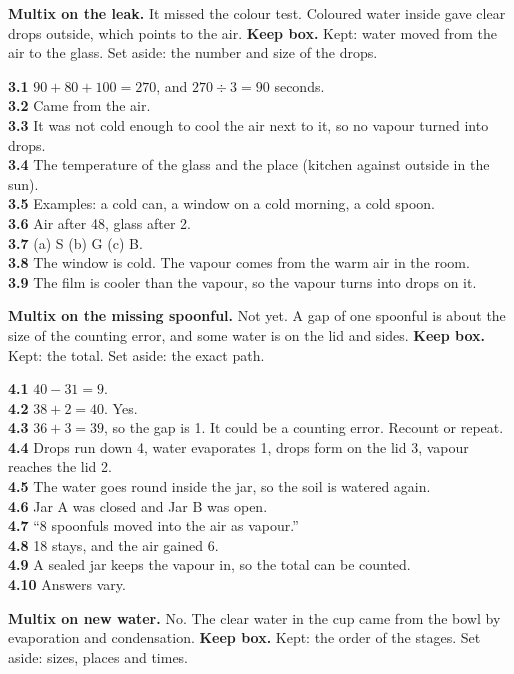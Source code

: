 \textbf{Multix on the leak.} It missed the colour test. Coloured water inside gave clear drops outside, which points to the air. \textbf{Keep box.} Kept: water moved from the air to the glass. Set aside: the number and size of the drops.

\textbf{3.1} $90+80+100=270$, and $270\div3=90$ seconds.\\
\textbf{3.2} Came from the air.\\
\textbf{3.3} It was not cold enough to cool the air next to it, so no vapour turned into drops.\\
\textbf{3.4} The temperature of the glass and the place (kitchen against outside in the sun).\\
\textbf{3.5} Examples: a cold can, a window on a cold morning, a cold spoon.\\
\textbf{3.6} Air after 48, glass after 2.\\
\textbf{3.7} (a) S (b) G (c) B.\\
\textbf{3.8} The window is cold. The vapour comes from the warm air in the room.\\
\textbf{3.9} The film is cooler than the vapour, so the vapour turns into drops on it.

\textbf{Multix on the missing spoonful.} Not yet. A gap of one spoonful is about the size of the counting error, and some water is on the lid and sides. \textbf{Keep box.} Kept: the total. Set aside: the exact path.

\textbf{4.1} $40-31=9$.\\
\textbf{4.2} $38+2=40$. Yes.\\
\textbf{4.3} $36+3=39$, so the gap is 1. It could be a counting error. Recount or repeat.\\
\textbf{4.4} Drops run down 4, water evaporates 1, drops form on the lid 3, vapour reaches the lid 2.\\
\textbf{4.5} The water goes round inside the jar, so the soil is watered again.\\
\textbf{4.6} Jar A was closed and Jar B was open.\\
\textbf{4.7} ``8 spoonfuls moved into the air as vapour.''\\
\textbf{4.8} 18 stays, and the air gained 6.\\
\textbf{4.9} A sealed jar keeps the vapour in, so the total can be counted.\\
\textbf{4.10} Answers vary.

\textbf{Multix on new water.} No. The clear water in the cup came from the bowl by evaporation and condensation. \textbf{Keep box.} Kept: the order of the stages. Set aside: sizes, places and times.

